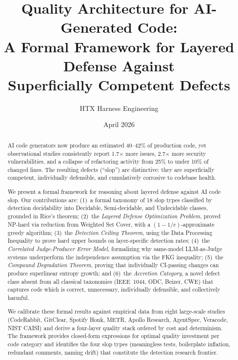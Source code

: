 \documentclass[11pt, a4paper]{article}
\title{Quality Architecture for AI-Generated Code:\\
A Formal Framework for Layered Defense Against\\
Superficially Competent Defects}
\author{HTX Harness Engineering}
\date{April 2026}
\theoremstyle{definition}
\theoremstyle{remark}
\begin{document}
\maketitle

\begin{abstract}
AI code generators now produce an estimated 40--42\% of production code, yet observational studies consistently report 1.7$\times$ more issues, 2.7$\times$ more security vulnerabilities, and a collapse of refactoring activity from 25\% to under 10\% of changed lines. The resulting defects (``slop'') are distinctive: they are superficially competent, individually defensible, and cumulatively corrosive to codebase health.

We present a formal framework for reasoning about layered defense against AI code slop. Our contributions are: (1)~a formal taxonomy of 18 slop types classified by detection decidability into Decidable, Semi-decidable, and Undecidable classes, grounded in Rice's theorem; (2)~the \emph{Layered Defense Optimization Problem}, proved NP-hard via reduction from Weighted Set Cover, with a $(1-1/e)$-approximate greedy algorithm; (3)~the \emph{Detection Ceiling Theorem}, using the Data Processing Inequality to prove hard upper bounds on layer-specific detection rates; (4)~the \emph{Correlated Judge-Producer Error Model}, formalizing why same-model LLM-as-Judge systems underperform the independence assumption via the FKG inequality; (5)~the \emph{Compound Degradation Theorem}, proving that individually CI-passing changes can produce superlinear entropy growth; and (6)~the \emph{Accretion Category}, a novel defect class absent from all classical taxonomies (IEEE~1044, ODC, Beizer, CWE) that captures code which is correct, unnecessary, individually defensible, and collectively harmful.

We calibrate these formal results against empirical data from eight large-scale studies (CodeRabbit, GitClear, Spotify Honk, METR, Apollo Research, AgentSpec, Veracode, NIST CAISI) and derive a four-layer quality stack ordered by cost and determinism. The framework provides closed-form expressions for optimal quality investment per code category and identifies the four slop types (meaningless tests, boilerplate inflation, redundant comments, naming drift) that constitute the detection research frontier.
\end{abstract}
\end{document}
